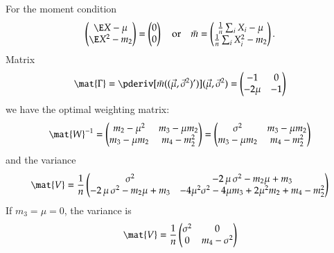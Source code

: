 \documentclass[a4paper]{article}
\numberwithin{equation}{subsection}
\begin{document}
For the moment condition
\begin{equation}
  \begin{pmatrix}
      \E X - \mu\\
      \E X^{2} - m_{2}\\
  \end{pmatrix}
  =
  \begin{pmatrix}
    0 \\ 0
  \end{pmatrix}
  \quad\text{or}\quad
  \bar m =
  \begin{pmatrix}
      \frac{1}{n} \sum_{i}X_{i} - \mu\\
      \frac{1}{n} \sum_{i}X_{i}^{2} - m_{2}\\
  \end{pmatrix}.
\end{equation}
Matrix
\begin{equation}
  \mat{\Gamma} = \pderiv[\bar m((\vec{\mu},
  \vec{\sigma}^{2})')]{(\vec{\mu}, \vec{\sigma}^{2})} =
  \begin{pmatrix}
    -1 & 0 \\ -2\mu & -1
  \end{pmatrix}
\end{equation}
we have 
the optimal weighting matrix:
\begin{equation}
  \mat{W}^{-1} =
  \begin{pmatrix}
    m_{2} - \mu^{2} & m_{3} - \mu m_{2} \\
    m_{3} - \mu m_{2} & m_{4} - m_{2}^{2}
  \end{pmatrix}
  =
  \begin{pmatrix}
    \sigma^{2} & m_{3} - \mu m_{2} \\
    m_{3} - \mu m_{2} & m_{4} - m_{2}^{2}
  \end{pmatrix}
\end{equation}
and the variance
\begin{equation}
  \mat{V} = \frac{1}{n}
  \begin{pmatrix}
    \sigma^{2} & 
    -2\,\mu\, \sigma^{2} - m_2 \mu + m_3 \\ 
    -2\,\mu\, \sigma^{2} - m_2 \mu + m_3 &
    -4\mu^{2} \sigma^{2} - 4\mu m_{3} +2 \mu^{2}m_{2} + m_4 - m_2^2
  \end{pmatrix}
\end{equation}
If $m_{3} = \mu = 0$, the
variance is
\begin{equation}
  \mat{V} = \frac{1}{n}
  \begin{pmatrix}
    \sigma^{2} &  0 \\
    0 & m_{4} - \sigma^{2}
  \end{pmatrix}
\end{equation}
\end{document}
